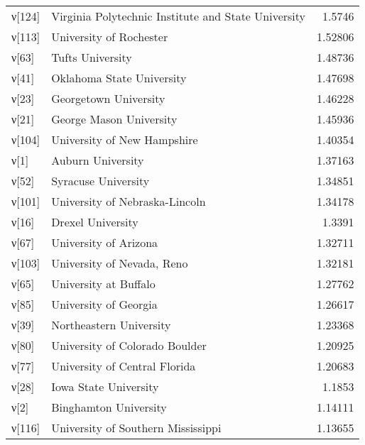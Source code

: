 \begin{tabular}{llr}
 ν[124] & Virginia Polytechnic Institute and State University            &  1.5746   \\
 ν[113] & University of Rochester                                        &  1.52806  \\
 ν[63]  & Tufts University                                               &  1.48736  \\
 ν[41]  & Oklahoma State University                                      &  1.47698  \\
 ν[23]  & Georgetown University                                          &  1.46228  \\
 ν[21]  & George Mason University                                        &  1.45936  \\
 ν[104] & University of New Hampshire                                    &  1.40354  \\
 ν[1]   & Auburn University                                              &  1.37163  \\
 ν[52]  & Syracuse University                                            &  1.34851  \\
 ν[101] & University of Nebraska-Lincoln                                 &  1.34178  \\
 ν[16]  & Drexel University                                              &  1.3391   \\
 ν[67]  & University of Arizona                                          &  1.32711  \\
 ν[103] & University of Nevada, Reno                                     &  1.32181  \\
 ν[65]  & University at Buffalo                                          &  1.27762  \\
 ν[85]  & University of Georgia                                          &  1.26617  \\
 ν[39]  & Northeastern University                                        &  1.23368  \\
 ν[80]  & University of Colorado Boulder                                 &  1.20925  \\
 ν[77]  & University of Central Florida                                  &  1.20683  \\
 ν[28]  & Iowa State University                                          &  1.1853   \\
 ν[2]   & Binghamton University                                          &  1.14111  \\
 ν[116] & University of Southern Mississippi                             &  1.13655  \\

\end{tabular}
